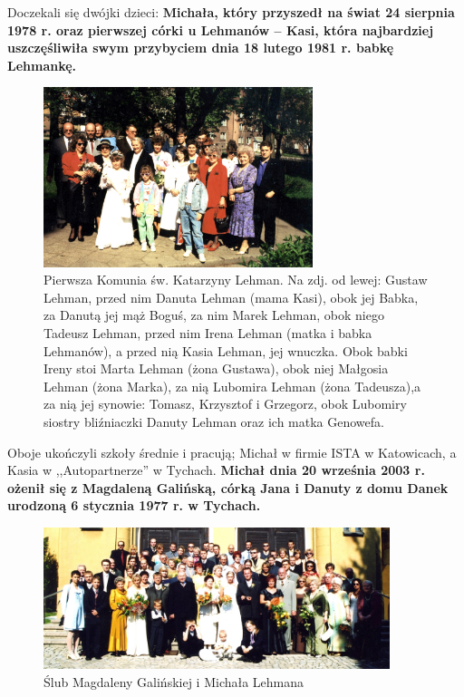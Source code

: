 Doczekali się dwójki dzieci: \textbf{Michała, który przyszedł na świat 24 sierpnia 1978 r. oraz pierwszej córki u Lehmanów -- Kasi, która najbardziej uszczęśliwiła swym przybyciem dnia 18 lutego 1981 r. babkę Lehmankę.}

\begin{figure}[!h]
\begin{center}
\includegraphics[width=0.7\textwidth]{photo/katarzyna_lehman_komunia.jpg}
\caption[Pierwsza Komunia św. Katarzyny Lehman]{Pierwsza Komunia św. Katarzyny Lehman. Na zdj. od lewej: Gustaw Lehman, przed nim Danuta Lehman (mama Kasi), obok jej Babka, za Danutą jej mąż Boguś, za nim Marek Lehman, obok niego Tadeusz Lehman, przed nim Irena Lehman (matka i babka Lehmanów), a przed nią Kasia Lehman, jej wnuczka. Obok babki Ireny stoi Marta Lehman (żona Gustawa), obok niej Małgosia Lehman (żona Marka), za nią Lubomira Lehman (żona Tadeusza),a za nią jej synowie: Tomasz, Krzysztof i Grzegorz, obok Lubomiry siostry bliźniaczki Danuty Lehman oraz ich matka Genowefa. }
\end{center}
\end{figure}

Oboje ukończyli szkoły średnie i pracują; Michał w firmie ISTA w Katowicach, a Kasia w ,,Autopartnerze'' w Tychach. \textbf{Michał dnia 20 września 2003 r. ożenił się z Magdaleną Galińską, córką Jana i Danuty z domu Danek urodzoną 6 stycznia 1977 r. w Tychach.}

\begin{figure}[!h]
\begin{center}
\includegraphics[width=0.9\textwidth]{photo/michal_magdalena_lehman_slub.jpg}
\caption{Ślub Magdaleny Galińskiej i Michała Lehmana}
\end{center}
\end{figure}

